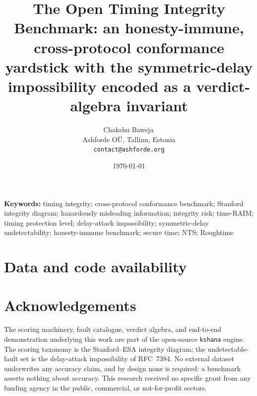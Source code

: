 \documentclass[11pt]{article}
\title{\textbf{The Open Timing Integrity Benchmark: an honesty-immune,
cross-protocol conformance yardstick with the symmetric-delay impossibility
encoded as a verdict-algebra invariant}}
\author{Chakshu Baweja\,\orcidlink{0009-0008-2098-0751}\\
\small Ashforde O\"U, Tallinn, Estonia \\
\small \texttt{contact@ashforde.org}}
\date{\today}
\theoremstyle{definition}
\newcommand{\code}[1]{\texttt{#1}}
\begin{document}
\maketitle

\begin{abstract}

\end{abstract}

\noindent\textbf{Keywords:} timing integrity; cross-protocol conformance
benchmark; Stanford integrity diagram; hazardously misleading information;
integrity risk; time-RAIM; timing protection level; delay-attack impossibility;
symmetric-delay undetectability; honesty-immune benchmark; secure time;
NTS; Roughtime

\vspace{0.5em}









\section*{Data and code availability}


\section*{Acknowledgements}
The scoring machinery, fault catalogue, verdict algebra, and end-to-end
demonstration underlying this work are part of the open-source \code{kshana}
engine. The scoring taxonomy is the Stanford--ESA integrity diagram; the
undetectable-fault set is the delay-attack impossibility of RFC~7384. No external
dataset underwrites any accuracy claim, and by design none is required: a
benchmark asserts nothing about accuracy. This research received no specific
grant from any funding agency in the public, commercial, or not-for-profit
sectors.




\appendix

\end{document}

